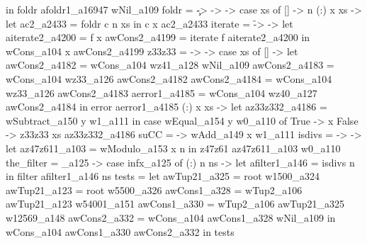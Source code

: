                          in foldr afoldr1_a16947 wNil_a109
          foldr = \c -> \n -> \xs -> case xs of
                                       [] -> n
                                       (:) x xs ->
                                         let ac2_a2433 = foldr c n xs
                                         in c x ac2_a2433
          iterate = \f -> \x -> let
                                  aiterate2_a4200 = f x
                                  awCons2_a4199 = iterate f aiterate2_a4200
                                in wCons_a104 x awCons2_a4199
          z33z33 = \xs -> \y -> case xs of
                                  [] ->
                                    let
                                      awCons2_a4182 = wCons_a104 wz41_a128 wNil_a109
                                      awCons2_a4183 = wCons_a104 wz33_a126 awCons2_a4182
                                      awCons2_a4184 = wCons_a104 wz33_a126 awCons2_a4183
                                      aerror1_a4185 = wCons_a104 wz40_a127 awCons2_a4184
                                    in error aerror1_a4185
                                  (:) x xs ->
                                    let az33z332_a4186 = wSubtract_a150 y w1_a111
                                    in case wEqual_a154 y w0_a110 of
                                         True -> x
                                         False -> z33z33 xs az33z332_a4186
          suCC = \x -> wAdd_a149 x w1_a111
          isdivs = \n -> \x -> let az47z611_a103 = wModulo_a153 x n
                               in z47z61 az47z611_a103 w0_a110
          the_filter = \infx_a125 -> case infx_a125 of
                                       (:) n ns ->
                                         let afilter1_a146 = isdivs n
                                         in filter afilter1_a146 ns
          tests = let
                    awTup21_a325 = root w1500_a324
                    awTup21_a123 = root w5500_a326
                    awCons1_a328 = wTup2_a106 awTup21_a123 w54001_a151
                    awCons1_a330 = wTup2_a106 awTup21_a325 w12569_a148
                    awCons2_a332 = wCons_a104 awCons1_a328 wNil_a109
                  in wCons_a104 awCons1_a330 awCons2_a332
        in tests

